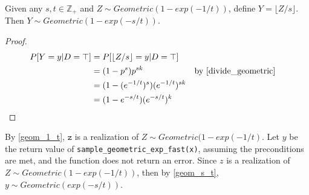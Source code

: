 \documentclass{article}
\begin{document}
\begin{theorem} 
\label{geom_s_t}
Given any $s,t \in \mathbb{Z}_+$ and $Z \sim Geometric(1-exp(-1/t))$, 
define $Y = \lfloor Z / s \rfloor$.
Then $Y \sim Geometric(1 - exp(-s/t))$\cite{CKS20}.
\end{theorem}

\begin{proof}
\begin{align*}
    P[Y = y | D = \top] &= P[\lfloor Z/s \rfloor = y | D = \top] \\
    &= (1 - p^s) p^{sk} && \text{by } \ref{divide_geometric} \\
    &= (1 - (e^{-1/t})^s) (e^{-1/t})^{sk} \\
    &= (1 - e^{-s/t}) (e^{-s/t})^k
\end{align*}
\end{proof}


By \ref{geom_1_t}, $\mathtt{z}$ is a realization of $Z \sim Geometric(1 - exp(-1/t)$.
Let $y$ be the return value of \texttt{sample\_geometric\_exp\_fast(x)}, assuming the preconditions are met, and the function does not return an error.
Since $z$ is a realization of $Z \sim Geometric(1 - exp(-1/t))$, then by \ref{geom_s_t}, $y \sim Geometric(exp(-s/t))$.



\end{document}
